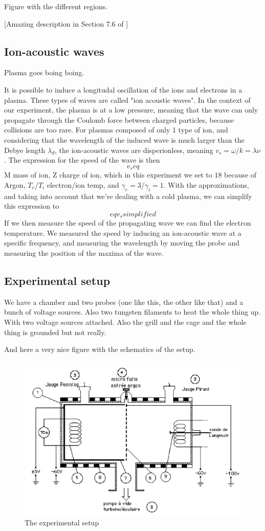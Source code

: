 Figure with the different regions.

[Amazing description in Section 7.6 of \cite{piel_plasma_2017}]

\subsection{Ion-acoustic waves}
Plasma goes boing boing.

It is possible to induce a longitudal oscillation of the ions and electrons in a plasma. These types of waves are called "ion acoustic waves". In the context of our experiment, the plasma is at a low pressure, meaning that the wave can only propagate through the Coulomb force between charged particles, because collisions are too rare.
For plasmas composed of only 1 type of ion, and considering that the wavelength of the induced wave is much larger than the Debye length $\lambda_d$, the ion-acoustic waves are disperionless, meaning $v_s = \omega/k = \lambda \nu$. The expression for the speed of the wave is then
\begin{equation}
    v_s eq
\end{equation}
M mass of ion, Z charge of ion, which in this experiment we set to $18$ because of Argon, $T_e$/$T_i$ electron/ion temp, and $\gamma_e=3$/$\gamma_i=1$. With the approximations, and taking into account that we're dealing with a cold plasma, we can simplify this expression to
\begin{equation}
    eq v_s simplified
\end{equation}
If we then measure the speed of the propagating wave we can find the electron temperature. We measured the speed by inducing an ion-acoustic wave at a specific frequency, and measuring the wavelength by moving the probe and measuring the position of the maxima of the wave.

\subsection{Experimental setup}
We have a chamber and two probes (one like this, the other like that) and a bunch of voltage sources.
Also two tungsten filaments to heat the whole thing up.
With two voltage sources attached.
Also the grill and the cage and the whole thing is grounded but not really.

And here a very nice figure with the schematics of the setup.
\begin{figure}
    \centering
    \includegraphics[width=12cm]{figures/experimental-setup.png}
    \caption{The experimental setup}
    \label{fig:experimental_setup}
\end{figure}